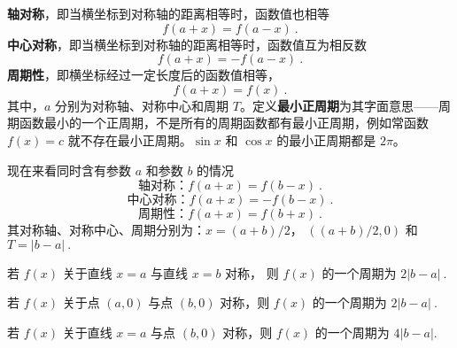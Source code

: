 

\textbf{轴对称}，即当横坐标到对称轴的距离相等时，函数值也相等
\begin{equation}
f\left( {a + x} \right) = f\left( {a - x} \right)~.
\end{equation}
\textbf{中心对称}，即当横坐标到对称轴的距离相等时，函数值互为相反数
\begin{equation}
f\left( {a + x} \right) =  - f\left( {a - x} \right)~.
\end{equation}
\textbf{周期性}，即横坐标经过一定长度后的函数值相等，
\begin{equation}
f\left( {a + x} \right) = f\left( x \right)~.
\end{equation}
其中，$a$ 分别为对称轴、对称中心和周期 $T$。定义\textbf{最小正周期}为其字面意思——周期函数最小的一个正周期，不是所有的周期函数都有最小正周期，例如常函数 $f(x) = c$ 就不存在最小正周期。$\sin x$ 和 $\cos x$ 的最小正周期都是 $2\pi$。

现在来看同时含有参数 $a$ 和参数 $b$ 的情况
\begin{equation}
\text{轴对称：} f\left( {a + x} \right) = f\left( {b - x} \right)~.
\end{equation}
\begin{equation}
\text{中心对称：} f\left( {a + x} \right) =  - f\left( {b - x} \right)~.
\end{equation}
\begin{equation}
\text{周期性：} f\left( {a + x} \right) = f\left( {b + x} \right)~.
\end{equation}
其对称轴、对称中心、周期分别为：$x = (a + b)/2$， $((a + b)/2, 0)$ 和 $T = \left| {b - a} \right|~.$

若 $f(x)$ 关于直线 $x=a$ 与直线 $x=b$ 对称， 则 $f(x)$ 的一个周期为 $2\left| {b - a} \right|~.$

若 $f(x)$ 关于点 $(a,0)$ 与点 $(b,0)$ 对称，则 $f(x)$ 的一个周期为 $2\left| {b - a} \right|~.$

若 $f(x)$ 关于直线 $x=a$ 与点 $(b,0)$ 对称，则 $f(x)$ 的一个周期为 $4\left| {b - a} \right|.$
